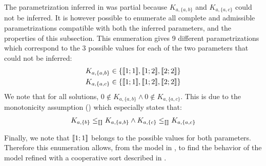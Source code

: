 \begin{example}\label{ex:enum-param-runningPH-1}
The parametrization inferred in  was partial because $K_{a,\{a,b\}}$ and $K_{a,\{a,c\}}$ could not be inferred.
It is however possible to enumerate all complete and admissible parametrizations
compatible with both the inferred parameters, and the properties of this subsection.
This enumeration gives 9 different parametrizations which correspond to the 3 possible values
for each of the two parameters that could not be inferred:
\begin{align*}
  K_{a,\{a,b\}} &\in \{ \llbracket 1 ; 1 \rrbracket, \llbracket 1 ; 2 \rrbracket, \llbracket 2 ; 2 \rrbracket \} \\
  K_{a,\{a,c\}} &\in \{ \llbracket 1 ; 1 \rrbracket, \llbracket 1 ; 2 \rrbracket, \llbracket 2 ; 2 \rrbracket \}
\end{align*}
We note that for all solutions, $0 \notin K_{a,\{a,b\}} \wedge 0 \notin K_{a,\{a,c\}}$.
This is due to the monotonicity assumption () which especially states that:
\begin{align*}
  K_{a,\{b\}} \leq_{\llbracket\rrbracket} K_{a,\{a,b\}} \wedge
  K_{a,\{c\}} \leq_{\llbracket\rrbracket} K_{a,\{a,c\}}
\end{align*}

Finally, we note that $\llbracket 1 ; 1 \rrbracket$ belongs to the possible values for both parameters.
Therefore this enumeration allows, from the model in ,
to find the behavior of the model refined with a cooperative sort described in .
\end{example}
